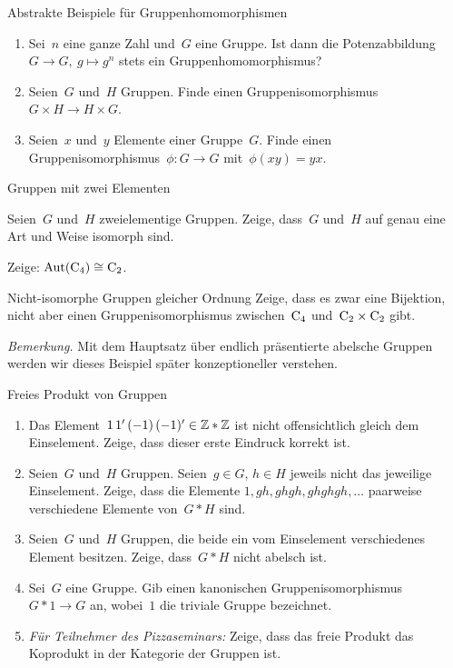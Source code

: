 \documentclass{algblatt}
\begin{document}

\begin{aufgabe}{Abstrakte Beispiele für Gruppenhomomorphismen}
\begin{enumerate}
\item Sei~$n$ eine ganze Zahl und~$G$ eine Gruppe. Ist dann die
Potenzabbildung~$G \to G,\ g \mapsto g^n$ stets ein Gruppenhomomorphismus?
\item Seien~$G$ und~$H$ Gruppen. Finde einen Gruppenisomorphismus~$G \times H \to H \times G$.
\item Seien~$x$ und~$y$ Elemente einer Gruppe~$G$. Finde einen
Gruppenisomorphismus~$\phi : G \to G$ mit~$\phi(xy) = yx$.
\end{enumerate}
\end{aufgabe}

\begin{aufgabeE}{Gruppen mit zwei Elementen}
\item Seien~$G$ und~$H$ zweielementige Gruppen. Zeige, dass~$G$ und~$H$ auf
genau eine Art und Weise isomorph sind.
\item Zeige: $\mathrm{Aut}(\mathrm{C}_4) \cong \mathrm{C}_2$.
\end{aufgabeE}

\begin{aufgabe}{Nicht-isomorphe Gruppen gleicher Ordnung}
Zeige, dass es zwar eine Bijektion, nicht aber einen Gruppenisomorphismus
zwischen~$\mathrm{C}_4$ und~$\mathrm{C}_2 \times \mathrm{C}_2$ gibt.

\emph{Bemerkung.} Mit dem Hauptsatz über endlich präsentierte abelsche Gruppen
werden wir dieses Beispiel später konzeptioneller verstehen.
\end{aufgabe}

\begin{aufgabe}{Freies Produkt von Gruppen}
\begin{enumerate}
\item Das Element~$1\,1'\,(-1)\,(-1)' \in \mathbb{Z} * \mathbb{Z}$ ist nicht offensichtlich
gleich dem Einselement. Zeige, dass dieser erste Eindruck korrekt ist.
\item Seien~$G$ und~$H$ Gruppen. Seien~$g \in G$, $h \in H$ jeweils nicht das
jeweilige Einselement. Zeige, dass die Elemente
$1, gh, ghgh, ghghgh, \ldots$
paarweise verschiedene Elemente von~$G * H$ sind.
\item Seien~$G$ und~$H$ Gruppen, die beide ein vom Einselement verschiedenes
Element besitzen. Zeige, dass~$G * H$ nicht abelsch ist.
\item Sei~$G$ eine Gruppe. Gib einen kanonischen Gruppenisomorphismus~$G * 1 \to G$ an,
wobei~$1$ die triviale Gruppe bezeichnet.

\tiny
\item \emph{Für Teilnehmer des Pizzaseminars:} Zeige, dass das freie
Produkt das Koprodukt in der Kategorie der Gruppen ist.
\end{enumerate}
\end{aufgabe}
\end{document}
